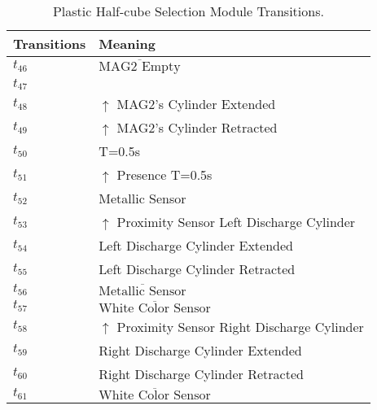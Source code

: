 \begin{table}[H]
\caption{Plastic Half-cube Selection Module Transitions.}
\centering
\begin{tabular}{M{5cm}M{10cm}}
Transitions & Meaning\\
\hline
\hyperlink{partialNet:t46}{\hypertarget{partialTable:t46}{$t_{46}$}} & \(\overline{\mbox{MAG2 Empty}}\)\\
\hyperlink{partialNet:t47}{\hypertarget{partialTable:t47}{$t_{47}$}} & \\
\hyperlink{partialNet:t48}{\hypertarget{partialTable:t48}{$t_{48}$}} & \(\uparrow\) MAG2's Cylinder Extended\\
\hyperlink{partialNet:t49}{\hypertarget{partialTable:t49}{$t_{49}$}} & \(\uparrow\) MAG2's Cylinder Retracted\\
\hyperlink{partialNet:tt50}{\hypertarget{partialTable:tt50}{$t_{50}$}} & T=0.5s\\
\hyperlink{partialNet:tt51}{\hypertarget{partialTable:tt51}{$t_{51}$}} & \(\uparrow\) Presence  T=0.5s\\
\hyperlink{partialNet:t52}{\hypertarget{partialTable:t52}{$t_{52}$}} & Metallic Sensor\\
\hyperlink{partialNet:t53}{\hypertarget{partialTable:t53}{$t_{53}$}} & \(\uparrow\) Proximity Sensor Left Discharge Cylinder\\
\hyperlink{partialNet:t54}{\hypertarget{partialTable:t54}{$t_{54}$}} & Left Discharge Cylinder Extended\\
\hyperlink{partialNet:t55}{\hypertarget{partialTable:t55}{$t_{55}$}} & Left Discharge Cylinder Retracted\\
\hyperlink{partialNet:t56}{\hypertarget{partialTable:t56}{$t_{56}$}} & \(\overline{\mbox{Metallic Sensor}}\)\\
\hyperlink{partialNet:t57}{\hypertarget{partialTable:t57}{$t_{57}$}} & \(\overline{\mbox{White Color Sensor}}\)\\
\hyperlink{partialNet:t58}{\hypertarget{partialTable:t58}{$t_{58}$}} & \(\uparrow\) Proximity Sensor Right Discharge Cylinder\\
\hyperlink{partialNet:t59}{\hypertarget{partialTable:t59}{$t_{59}$}} & Right Discharge Cylinder Extended\\
\hyperlink{partialNet:t60}{\hypertarget{partialTable:t60}{$t_{60}$}} & Right Discharge Cylinder Retracted\\
\hyperlink{partialNet:t61}{\hypertarget{partialTable:t61}{$t_{61}$}} & \(\overline{\mbox{White Color Sensor}}\)\\

\end{tabular}
\end{table}

